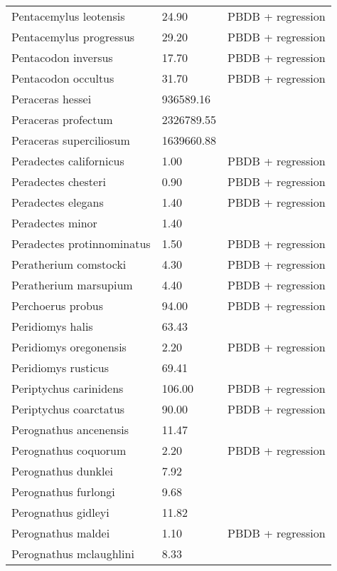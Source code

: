 \documentclass{article}
\begin{document}
\begin{center}
\begin{longtable}{p{} p{} p{}}
    Pentacemylus leotensis & 24.90 & PBDB + regression \\ 
    Pentacemylus progressus & 29.20 & PBDB + regression \\ 
    Pentacodon inversus & 17.70 & PBDB + regression \\ 
    Pentacodon occultus & 31.70 & PBDB + regression \\ 
    Peraceras hessei & 936589.16 & \cite{Tomiya2013} \\ 
    Peraceras profectum & 2326789.55 & \cite{Tomiya2013} \\ 
    Peraceras superciliosum & 1639660.88 & \cite{Tomiya2013} \\ 
    Peradectes californicus & 1.00 & PBDB + regression \\ 
    Peradectes chesteri & 0.90 & PBDB + regression \\ 
    Peradectes elegans & 1.40 & PBDB + regression \\ 
    Peradectes minor & 1.40 & \cite{Taylor1976} \\ 
    Peradectes protinnominatus & 1.50 & PBDB + regression \\ 
    Peratherium comstocki & 4.30 & PBDB + regression \\ 
    Peratherium marsupium & 4.40 & PBDB + regression \\ 
    Perchoerus probus & 94.00 & PBDB + regression \\ 
    Peridiomys halis & 63.43 & \cite{Tomiya2013} \\ 
    Peridiomys oregonensis & 2.20 & PBDB + regression \\ 
    Peridiomys rusticus & 69.41 & \cite{Tomiya2013} \\ 
    Periptychus carinidens & 106.00 & PBDB + regression \\ 
    Periptychus coarctatus & 90.00 & PBDB + regression \\ 
    Perognathus ancenensis & 11.47 & \cite{Tomiya2013} \\ 
    Perognathus coquorum & 2.20 & PBDB + regression \\ 
    Perognathus dunklei & 7.92 & \cite{Tomiya2013} \\ 
    Perognathus furlongi & 9.68 & \cite{Tomiya2013} \\ 
    Perognathus gidleyi & 11.82 & \cite{Tomiya2013} \\ 
    Perognathus maldei & 1.10 & PBDB + regression \\ 
    Perognathus mclaughlini & 8.33 & \cite{Tomiya2013} \\ 

\end{longtable}
\end{center}
\end{document}
